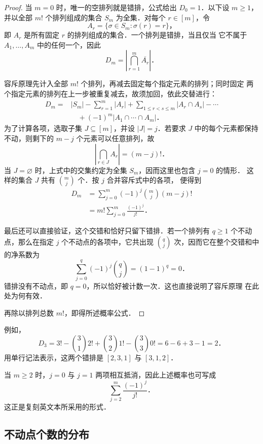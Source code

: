 \documentclass[UTF8,11pt,a4paper,fontset=none]{ctexart}
\theoremstyle{definition}
\begin{document}
\begin{proof}
当 \(m=0\) 时，唯一的空排列就是错排，公式给出 \(D_0=1\)．以下设
\(m\geq1\)，并以全部 \(m!\) 个排列组成的集合 \(S_m\) 为全集．对每个
\(r\in[m]\)，令
\[
  A_r=\{\sigma\in S_m:\sigma(r)=r\}\text{，}
\]
即 \(A_r\) 是所有固定 \(r\) 的排列组成的集合．一个排列是错排，当且仅当
它不属于 \(A_1,\ldots,A_m\) 中的任何一个，因此
\[
  D_m=\left|\bigcap_{r=1}^{m}\overline{A_r}\right|\text{．}
\]

容斥原理先计入全部 \(m!\) 个排列，再减去固定每个指定元素的排列；同时固定
两个指定元素的排列在上一步被重复减去，故须加回，依此交替进行：
\begin{align*}
  D_m
    ={}&|S_m|-\sum_{r=1}^{m}|A_r|
       +\sum_{1\leq r<s\leq m}|A_r\cap A_s|-\cdots\\
       &\quad+(-1)^m|A_1\cap\cdots\cap A_m|\text{．}
\end{align*}
为了计算各项，选取子集 \(J\subseteq[m]\)，并设 \(|J|=j\)．若要求
\(J\) 中的每个元素都保持不动，则剩下的 \(m-j\) 个元素可以任意排列，故
\[
  \left|\bigcap_{r\in J}A_r\right|=(m-j)!\text{．}
\]
当 \(J=\varnothing\) 时，上式中的交集约定为全集 \(S_m\)，因而这里也包含
\(j=0\) 的情形．
这样的集合 \(J\) 共有 \(\binom{m}{j}\) 个．按 \(j\) 合并容斥式中的各项，
便得到
\begin{align*}
  D_m
    &=\sum_{j=0}^{m}(-1)^j\binom{m}{j}(m-j)!\\
    &=m!\sum_{j=0}^{m}\frac{(-1)^j}{j!}\text{．}
\end{align*}

最后还可以直接验证，这个交错和恰好只留下错排．若一个排列有
\(q\geq1\) 个不动点，那么在指定 \(j\) 个不动点的各项中，它共出现
\(\binom{q}{j}\) 次，因而它在整个交错和中的净系数为
\[
  \sum_{j=0}^{q}(-1)^j\binom{q}{j}=(1-1)^q=0\text{．}
\]
错排没有不动点，即 \(q=0\)，所以恰好被计数一次．这也直接说明了容斥原理
在此处为何有效．

再除以排列总数 \(m!\)，即得所述概率公式．
\end{proof}

例如，
\[
  D_3
    =3!-\binom{3}{1}2!+\binom{3}{2}1!-\binom{3}{3}0!
    =6-6+3-1
    =2\text{．}
\]
用单行记法表示，这两个错排是 \([2,3,1]\) 与 \([3,1,2]\)．

当 \(m\geq 2\) 时，\(j=0\) 与 \(j=1\) 两项相互抵消，因此上述概率也可写成
\[
  \sum_{j=2}^{m}\frac{(-1)^j}{j!}\text{．}
\]
这正是复刻英文本所采用的形式．

\subsection{不动点个数的分布}
\end{document}
